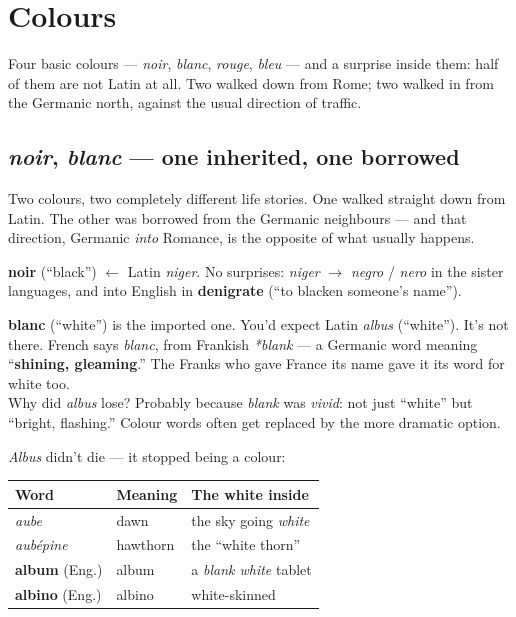 \chapter{Colours}
\label{ch:colours}

Four basic colours --- \emph{noir}, \emph{blanc}, \emph{rouge}, \emph{bleu} ---
and a surprise inside them: half of them are not Latin at all. Two walked down
from Rome; two walked in from the Germanic north, against the usual direction of
traffic.

\section{\emph{noir}, \emph{blanc} --- one inherited, one borrowed}
\label{lesson:noir-blanc}

Two colours, two completely different life stories. One walked straight down
from Latin. The other was borrowed from the Germanic neighbours --- and that
direction, Germanic \emph{into} Romance, is the opposite of what usually
happens.

\begin{cousinweb}
\textbf{noir} (``black'') $\leftarrow$ Latin \emph{niger}. No surprises:
\emph{niger} $\to$ \emph{negro} / \emph{nero} in the sister languages, and into
English in \textbf{denigrate} (``to blacken someone's name'').
\end{cousinweb}

\begin{cousinweb}
\textbf{blanc} (``white'') is the imported one. You'd expect Latin \emph{albus}
(``white''). It's not there. French says \emph{blanc}, from Frankish
\emph{*blank} --- a Germanic word meaning ``\textbf{shining, gleaming}.'' The
Franks who gave France its name gave it its word for white too.\\[3pt]
Why did \emph{albus} lose? Probably because \emph{blank} was \emph{vivid}: not
just ``white'' but ``bright, flashing.'' Colour words often get replaced by the
more dramatic option.
\end{cousinweb}

\emph{Albus} didn't die --- it stopped being a colour:

\begin{center}
\begin{tabular}{@{}lll@{}}
\toprule
Word & Meaning & The white inside \\
\midrule
\emph{aube} & dawn & the sky going \emph{white} \\
\emph{aub\'{e}pine} & hawthorn & the ``white thorn'' \\
\textbf{album} (Eng.) & album & a \emph{blank white} tablet \\
\textbf{albino} (Eng.) & albino & white-skinned \\
\bottomrule
\end{tabular}
\end{center}

